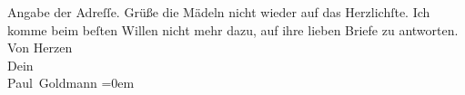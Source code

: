 \begin{ledgroupsized}[t]{13cm}
               Angabe der Adreſſe. Grüße die Mädeln nicht wieder auf das Herzlichſte. Ich komme
               beim beſten Willen nicht mehr dazu, auf ihre lieben Briefe zu antworten.\pend
           \pstart
           Von Herzen {\\[\baselineskip]}Dein {\\[\baselineskip]}\spacefill\mbox{Paul Goldmann}\pend
           \leftskip=0em{}
         
         \endnumbering{}\end{ledgroupsized}  \newcommand{\dateiname}{L03209}\newcommand{\titel}{Paul Goldmann an Arthur Schnitzler, 16. 5. [1902]}\newcommand{\editorInnen}{Martin Anton Müller und Laura Untner}
      